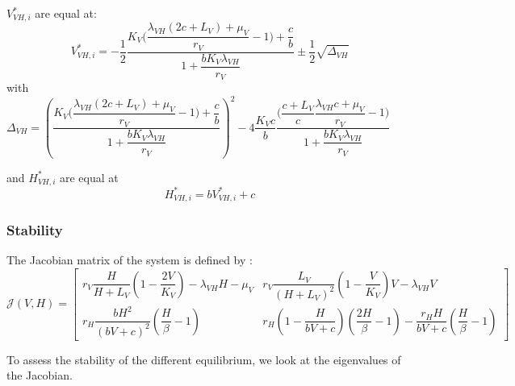 \documentclass{article}
\newcommand{\lv}{\lambda_{VH}}
\begin{document}
$V^{*}_{VH,i}$ are equal at:
\begin{equation}
V^{*}_{VH,i} = -\dfrac{1}{2} \dfrac{ K_V\Big(\dfrac{\lv(2c+L_V) + \mu_V}{r_V} - 1\Big) + \dfrac{c}{b}}{1 + \dfrac{b K_V \lv}{r_V}}  \pm \dfrac{1}{2} \sqrt{\Delta_{VH}}
\label{equilibreVH:V}
\end{equation}
with $\Delta_{VH} = \left( \dfrac{ K_V\Big(\dfrac{\lv(2c+L_V) + \mu_V}{r_V} - 1\Big) + \dfrac{c}{b}}{1 + \dfrac{b K_V \lv}{r_V}}\right)^2 - 4 \dfrac{K_Vc}{b} \dfrac{\Big(\dfrac{c+L_V}{c} \dfrac{\lv c + \mu_V}{r_V} - 1\Big)}{1 + \dfrac{b K_V \lv}{r_V}} $

and $H^*_{VH,i}$ are equal at
\begin{equation}
H^*_{VH,i} = b V^*_{VH,i} + c
\label{equilibreVH:H}
\end{equation}

\subsubsection{Stability}
The Jacobian matrix of the system is defined by :
\begin{equation}
\mathcal{J}(V,H) =  \begin{bmatrix}
r_V \dfrac{H}{H+L_V}(1-\dfrac{2V}{K_V}) - \lv H - \mu_V & r_V \dfrac{L_V}{(H+L_V)^2}(1-\dfrac{V}{K_V})V  - \lv V\\
r_H \dfrac{bH^2}{(bV+c)^2} (\dfrac{H}{\beta}-1) & r_H(1-\dfrac{H}{bV+c})(\dfrac{2H}{\beta}-1) - \dfrac{r_H H}{bV+c}(\dfrac{H}{\beta}-1)
\end{bmatrix}
\label{stabilityVH:jacobian}
\end{equation}

To assess the stability of the different equilibrium, we look at the eigenvalues of the Jacobian.
\end{document}
